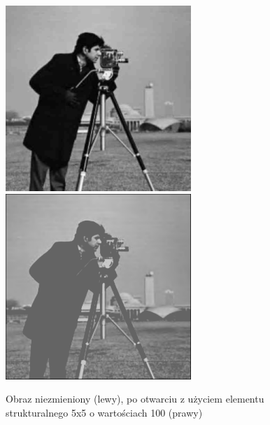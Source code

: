 \documentclass[a4paper,12pt]{book}
\begin{document}
\begin{figure}[H]
	\caption{Obraz niezmieniony (lewy), po otwarciu z użyciem elementu strukturalnego 5x5 o wartościach 100 (prawy)}
	\includegraphics[width=7cm, height=7cm]{man-unmodified.jpg}
	\includegraphics[width=7cm, height=7cm]{morph-gray-opening-strel5x5-100.png}
\end{figure}
\end{document}
